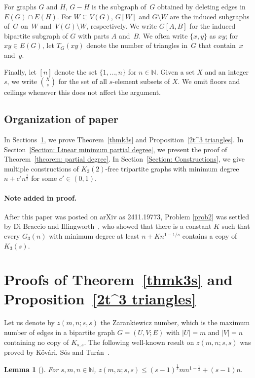 \documentclass[11pt]{article}
\newtheorem{lemma}[theorem]{Lemma}
\numberwithin{equation}{section}
\begin{document}
	
	For graphs $G$ and $H$, $G-H$ is the subgraph of~$G$ obtained by deleting edges in $E(G) \cap E(H)$. 
	For $W \subseteq V (G)$, $G[W]$ and $G \setminus W$ are the induced subgraphs of~$G$ on~$W$ and~$V(G) \setminus W$, respectively.
	We write $G[A,B]$ for the induced bipartite subgraph of $G$ with parts $A$ and~$B$. 
	We often write $\{x, y\}$ as $xy$; for $xy \in E(G)$, let $T_G(xy)$ denote the number of triangles in~$G$ that contain~$x$ and~$y$.

	
	
	Finally, let $[n]$ denote the set $\{1,\dots,n\}$ for $n\in \mathbb{N}$. Given a set $X$ and an integer $s$, we write $\binom{X}{s}$ for the set of all $s$-element subsets of $X$.
	We omit floors and ceilings whenever this does not affect the argument.
	
	
	
	
	\subsection{Organization of paper}
	In Sections~\ref{Section: Proof of Theorem thmk3s}, we prove Theorem~\ref{thmk3s} and Proposition~\ref{2t^3 triangles}.
	In Section~\ref{Section: Linear minimum partial degree}, we present the proof of  Theorem~\ref{theorem: partial degree}. 
	In Section~\ref{Section: Constructions}, we give multiple constructions of $K_3(2)$-free tripartite graphs with minimum degree $n+c'n^{\frac{1}{2}}$ for some $c'\in (0,1)$.

 \paragraph{Note added in proof.} After this paper was posted on arXiv as 2411.19773, Problem \ref{prob2} was settled by Di Braccio and Illingworth~\cite{DiBraccioIllingworth2024}, who showed that there is a constant $K$ such that every $G_3(n)$ with minimum degree at least $n + Kn^{1 - 1/s}$ contains a copy of $K_3(s)$.
	
	
	
	
	\section{Proofs of Theorem~\ref{thmk3s} and Proposition~\ref{2t^3 triangles}}\label{Section: Proof of Theorem thmk3s}
	
	Let us denote by $z(m,n;s,s)$ the Zarankiewicz number, which is the maximum number of edges in a bipartite graph $G = (U, V ; E)$ with $|U| = m$ and $|V | = n$ containing no copy of $K_{s,s}$. The following well-known result on $z(m,n;s,s)$ was proved by K\"{o}v\'{a}ri, S\'{o}s and Tur\'{a}n~\cite{kHovari1954problem}.
	\begin{lemma}[\cite{kHovari1954problem}]\label{Zarankiewicz}
		For $s,m,n \in \mathbb{N}$, 
		$z(m,n;s,s)\le (s-1)^{\frac1s} mn^{1-\frac{1}{s}} + (s-1)n.$
	\end{lemma}
	
\end{document}
